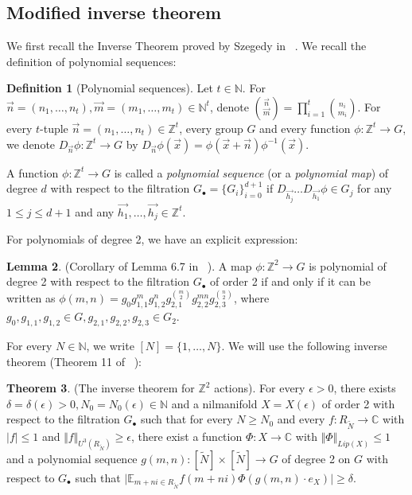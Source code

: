 \documentclass[12pt,amstex]{amsart}
\theoremstyle{definition}
\newtheorem{thm}{Theorem}[section]
\newtheorem{lem}[thm]{Lemma}
\newtheorem{defn}[thm]{Definition}
\def \d {\delta}
\def \e {\epsilon}
\def \R {R_{\tilde{N}}}
\begin{document}
\subsection{Modified inverse theorem}
We first recall the Inverse Theorem proved by Szegedy in ~\cite{Sz}.
We recall the definition of polynomial sequences:
\begin{defn}[Polynomial sequences]
Let $t\in\mathbb{N}$. For $\vec{n}=(n_{1},\dots,n_{t}),\vec{m}=(m_{1},\dots,m_{t})\in\mathbb{N}^{t}$, denote
  $\binom{\vec{n}}{\vec{m}}=\prod_{i=1}^{t}\binom{n_{i}}{m_{i}}$.
For every $t$-tuple $\vec{n}=(n_{1},\dots,n_{t})\in\mathbb{Z}^{t}$, every group $G$ and every function $\phi\colon \mathbb{Z}^{t}\rightarrow G$, we denote $D_{\vec{n}}\phi\colon \mathbb{Z}^{t}\rightarrow G$ by $D_{\vec{n}}\phi(\vec{x})=\phi(\vec{x}+\vec{n})\phi^{-1}(\vec{x})$.

A function $\phi\colon \mathbb{Z}^{t}\rightarrow G$ is called a \emph{polynomial sequence} (or a \emph{polynomial map}) of degree $d$ with respect to the filtration $G_{\bullet}=\{G_{i}\}_{i=0}^{d+1}$ if $D_{\vec{h_{j}}}\dots D_{\vec{h_{1}}}\phi\in G_{j}$ for any $1\leq j\leq d+1$ and any $\vec{h_{1}},\dots,\vec{h_{j}}\in\mathbb{Z}^{t}$.
\end{defn}

For polynomials of degree 2, we have an explicit expression:
\begin{lem}\label{2p}(Corollary of Lemma 6.7 in ~\cite{GT}).
  A map $\phi\colon\mathbb{Z}^{2}\rightarrow G$ is polynomial of degree 2 with respect to the filtration $G_{\bullet}$ of order 2 if and only if it can be written as $\phi(m,n)=g_{0}g_{1,1}^{m}g_{1,2}^{n}g_{2,1}^{\binom{m}{2}}g_{2,2}^{mn}g_{2,3}^{\binom{n}{2}}$, where $g_{0},g_{1,1},g_{1,2}\in G, g_{2,1},g_{2,2},g_{2,3}\in G_{2}$.
\end{lem}

For every $N\in\mathbb{N}$, we write $[N]=\{1,\dots,N\}$.
We will use the following inverse theorem (Theorem 11 of ~\cite{Sz}):

\begin{thm}\label{inv2}(The inverse theorem for $\mathbb{Z}^{2}$ actions). For every $\e>0$, there exists $\d=\d(\e)>0, N_{0}=N_{0}(\e)\in\mathbb{N}$ and a nilmanifold $X=X(\e)$ of order 2 with respect to the filtration $G_{\bullet}$ such that for every $N\geq N_{0}$ and every $f\colon \R\rightarrow\mathbb{C}$ with
$\vert f\vert\leq 1$ and $\Vert f\Vert_{U^{3}(\R)}\geq\e$, there exist a function $\Phi\colon X\rightarrow\mathbb{C}$ with $\Vert\Phi\Vert_{Lip(X)}\leq 1$ and a polynomial sequence $g(m,n)\colon [\tilde{N}]\times[\tilde{N}]\rightarrow G$ of degree 2 on $G$ with respect to $G_{\bullet}$ such that $\vert\mathbb{E}_{m+ni\in\R}f(m+ni)\Phi(g(m,n)\cdot e_{X})\vert\geq\d$.
\end{thm}
\end{document}

